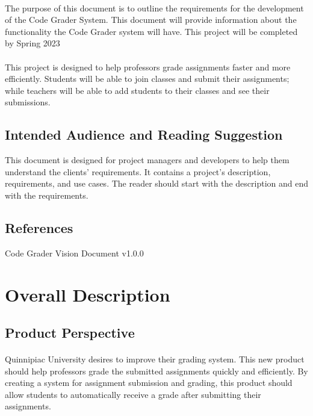 \documentclass{article}
\begin{document}
\paragraph{} The purpose of this document is to outline the requirements for the development of the Code Grader System. This document will provide information about the functionality the Code Grader system will have. This project will be completed by Spring 2023

\paragraph{} This project is designed to help professors grade assignments faster and more efficiently. Students will be able to join classes and submit their assignments; while teachers will be able to add students to their classes and see their submissions.

\subsection{Intended Audience and Reading Suggestion}

This document is designed for project managers and developers to help them understand the clients' requirements. It contains a project's description, requirements, and use cases. The reader should start with the description and end with the requirements.

\subsection{References}
Code Grader Vision Document v1.0.0
\section{Overall Description}

\subsection{Product Perspective}
\paragraph{} Quinnipiac University desires to improve their grading system. This new product should help professors grade the submitted assignments quickly and efficiently. By creating a system for assignment submission and grading, this product should allow students to automatically receive a grade after submitting their assignments.
\end{document}
